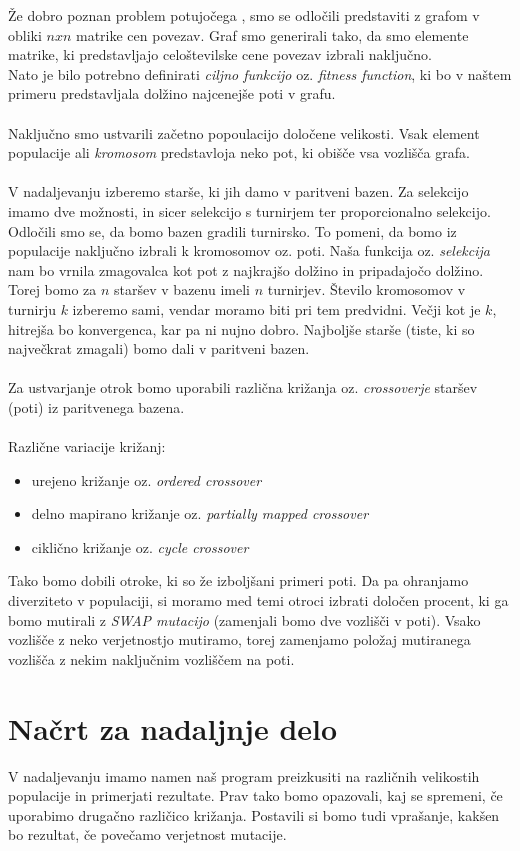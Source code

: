 \documentclass[a4paper]{article}
\begin{document}
Že dobro poznan problem potujočega , smo se odločili predstaviti z grafom v obliki $n x n$ matrike cen povezav. Graf smo generirali tako, da smo elemente matrike, ki predstavljajo celoštevilske cene povezav izbrali naključno. 
\\
Nato je bilo potrebno definirati \textit{ciljno funkcijo} oz. \textit{fitness function}, ki bo v naštem primeru predstavljala dolžino najcenejše poti v grafu. 
\\
\\
Naključno smo ustvarili začetno popoulacijo določene velikosti. Vsak element populacije ali \textit{kromosom} predstavloja neko pot, ki obišče vsa vozlišča grafa. 
\\
\\
V nadaljevanju izberemo starše, ki jih damo v paritveni bazen. Za selekcijo imamo dve možnosti, in sicer selekcijo s turnirjem ter proporcionalno selekcijo. Odločili smo se, da bomo bazen gradili turnirsko. To pomeni, da bomo iz populacije naključno izbrali k kromosomov oz. poti. Naša funkcija oz. \textit{selekcija} nam bo vrnila zmagovalca kot pot z najkrajšo dolžino in pripadajočo dolžino. Torej bomo za $n$ staršev v bazenu imeli $n$ turnirjev. Število kromosomov v turnirju $k$ izberemo sami, vendar moramo biti pri tem predvidni. Večji kot je $k$, hitrejša bo konvergenca, kar pa ni nujno dobro. Najboljše starše (tiste, ki so največkrat zmagali) bomo dali v paritveni bazen.
\\
\\
Za ustvarjanje otrok bomo uporabili različna križanja oz. \textit{crossoverje} staršev (poti) iz paritvenega bazena.
\\
\\
Različne variacije križanj:
 \begin{itemize}

\item urejeno križanje oz. \textit{ordered crossover}
\item delno mapirano križanje oz.\textit{ partially mapped crossover}
\item ciklično križanje oz. \textit{cycle crossover}

 \end{itemize}

Tako bomo dobili otroke, ki so že izboljšani primeri poti. Da pa ohranjamo diverziteto v populaciji, si moramo med temi otroci izbrati določen procent, ki ga bomo mutirali z \textit{SWAP mutacijo} (zamenjali bomo dve vozlišči v poti). Vsako vozlišče z neko verjetnostjo mutiramo, torej zamenjamo položaj mutiranega vozlišča z nekim naključnim vozliščem na poti. 

\newpage
\section{Načrt za nadaljnje delo}

V nadaljevanju imamo namen naš program preizkusiti na različnih velikostih populacije in primerjati rezultate. Prav tako bomo opazovali, kaj se spremeni, če uporabimo drugačno različico križanja. Postavili si bomo tudi vprašanje, kakšen bo rezultat, če povečamo verjetnost mutacije. 
\end{document}
